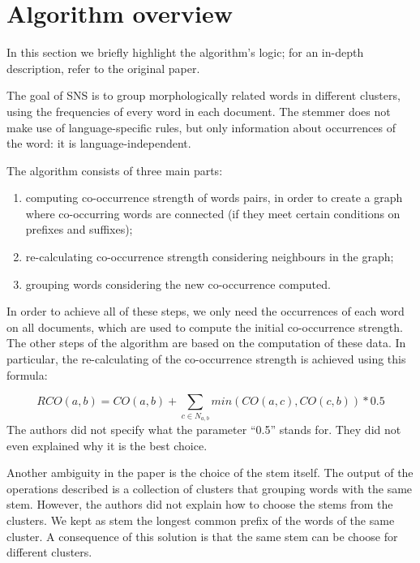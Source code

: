 \section{Algorithm overview}
    In this section we briefly highlight the algorithm's logic; for an in-depth description, refer to the original paper\cite{sns}.
 
    The goal of SNS is to group morphologically related words in different clusters, using the frequencies of every word in each document. The stemmer does not make use of language-specific rules, but only information about occurrences of the word: it is language-independent.
    
The algorithm consists of three main parts:

    \begin{enumerate}
        \item computing co-occurrence strength of words pairs, in order to create a graph where co-occurring words are connected (if they meet certain conditions on prefixes and suffixes);
        \item re-calculating co-occurrence strength considering neighbours in the graph;
        \item grouping words considering the new co-occurrence computed.
    \end{enumerate}

    In order to achieve all of these steps, we only need the occurrences of each word on all documents, which are used to compute the initial co-occurrence strength. The other steps of the algorithm are based on the computation of these data. In particular, the re-calculating of the co-occurrence strength is achieved using this formula:
    
    \begin{equation}
		RCO(a,b) = CO(a,b) + \sum_{c \in N_{a,b}}min(CO(a,c), CO(c, b)) * 0.5    
    \end{equation}
    The authors did not specify what the parameter ``0.5'' stands for. They did not even explained why it is the best choice.
    
Another ambiguity in the paper is the choice of the stem itself. The output of the operations described is a collection of clusters that grouping words with the same stem. However, the authors did not explain how to choose the stems from the clusters. We kept as stem the longest common prefix of the words of the same cluster. A consequence of this solution is that the same stem can be choose for different clusters.